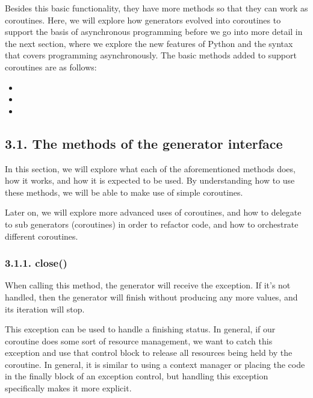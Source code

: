 \documentclass[a4paper,10pt,english]{sphinxmanual}
\begin{document}
Besides this basic functionality, they have more methods so that they can work as
coroutines. Here, we will explore how generators evolved into coroutines to
support the basis of asynchronous programming before we go into more detail in the next
section, where we explore the new features of Python and the syntax that covers
programming asynchronously. The basic methods added to support
coroutines are as follows:
\begin{itemize}
\item {} 

\item {} 

\item {} 

\end{itemize}


\subsection{3.1. The methods of the generator interface}
\label{\detokenize{chapters/7_generators/index:the-methods-of-the-generator-interface}}
In this section, we will explore what each of the aforementioned methods does, how it
works, and how it is expected to be used. By understanding how to use these methods, we
will be able to make use of simple coroutines.

Later on, we will explore more advanced uses of coroutines, and how to delegate to sub\sphinxhyphen{}
generators (coroutines) in order to refactor code, and how to orchestrate different
coroutines.


\subsubsection{3.1.1. close()}
\label{\detokenize{chapters/7_generators/index:close}}
When calling this method, the generator will receive the  exception. If it’s
not handled, then the generator will finish without producing any more values, and its
iteration will stop.

This exception can be used to handle a finishing status. In general, if our coroutine does
some sort of resource management, we want to catch this exception and use that control
block to release all resources being held by the coroutine. In general, it is similar to using a
context manager or placing the code in the finally block of an exception control, but
handling this exception specifically makes it more explicit.
\end{document}

